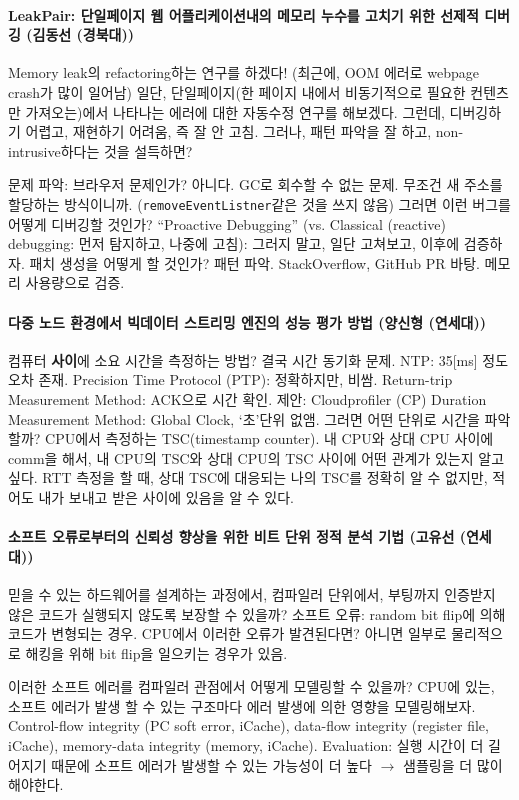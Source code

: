 \documentclass{article}
\begin{document}
\paragraph{LeakPair: 단일페이지 웹 어플리케이션내의 메모리 누수를 고치기 위한 선제적 디버깅 (김동선 (경북대))}
Memory leak의 refactoring하는 연구를 하겠다! (최근에, OOM 에러로 webpage crash가 많이 일어남)
일단, 단일페이지(한 페이지 내에서 비동기적으로 필요한 컨텐츠만 가져오는)에서 나타나는 에러에 대한 자동수정 연구를 해보겠다.
그런데, 디버깅하기 어렵고, 재현하기 어려움, 즉 잘 안 고침.
그러나, 패턴 파악을 잘 하고, non-intrusive하다는 것을 설득하면?

문제 파악: 브라우저 문제인가?
아니다. GC로 회수할 수 없는 문제. 무조건 새 주소를 할당하는 방식이니까.
(\texttt{removeEventListner}같은 것을 쓰지 않음)
그러면 이런 버그를 어떻게 디버깅할 것인가?
``Proactive Debugging'' (vs. Classical (reactive) debugging: 먼저 탐지하고, 나중에 고침): 그러지 말고, 일단 고쳐보고, 이후에 검증하자.
패치 생성을 어떻게 할 것인가?
패턴 파악. StackOverflow, GitHub PR 바탕. 메모리 사용량으로 검증.
\paragraph{다중 노드 환경에서 빅데이터 스트리밍 엔진의 성능 평가 방법 (양신형 (연세대))}
컴퓨터 \textbf{사이}에 소요 시간을 측정하는 방법?
결국 시간 동기화 문제. NTP: 35[ms] 정도 오차 존재.
Precision Time Protocol (PTP): 정확하지만, 비쌈.
Return-trip Measurement Method: ACK으로 시간 확인.
제안: Cloudprofiler (CP) Duration Measurement Method: Global Clock, `초'단위 없앰.
그러면 어떤 단위로 시간을 파악할까? CPU에서 측정하는 TSC(timestamp counter).
내 CPU와 상대 CPU 사이에 comm을 해서, 내 CPU의 TSC와 상대 CPU의 TSC 사이에 어떤 관계가 있는지 알고 싶다.
RTT 측정을 할 때, 상대 TSC에 대응되는 나의 TSC를 정확히 알 수 없지만, 적어도 내가 보내고 받은 사이에 있음을 알 수 있다.
\paragraph{소프트 오류로부터의 신뢰성 향상을 위한 비트 단위 정적 분석 기법 (고유선 (연세대))}
믿을 수 있는 하드웨어를 설계하는 과정에서, 컴파일러 단위에서, 부팅까지 인증받지 않은 코드가 실행되지 않도록 보장할 수 있을까?
소프트 오류: random bit flip에 의해 코드가 변형되는 경우. CPU에서 이러한 오류가 발견된다면?
아니면 일부로 물리적으로 해킹을 위해 bit flip을 일으키는 경우가 있음.

이러한 소프트 에러를 컴파일러 관점에서 어떻게 모델링할 수 있을까?
CPU에 있는, 소프트 에러가 발생 할 수 있는 구조마다 에러 발생에 의한 영향을 모델링해보자.
Control-flow integrity (PC soft error, iCache), data-flow integrity (register file, iCache), memory-data integrity (memory, iCache).
Evaluation: 실행 시간이 더 길어지기 때문에 소프트 에러가 발생할 수 있는 가능성이 더 높다 $\rightarrow$ 샘플링을 더 많이 해야한다.
\end{document}
